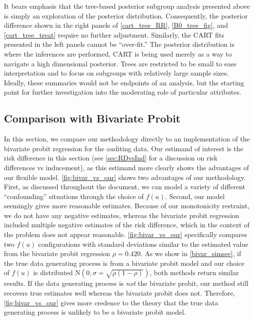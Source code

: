 \documentclass[aoas,preprint, 11pt, dvipsnames, table, x11name]{imsart}
\newcommand{\N}{\mbox{N}}
\theoremstyle{remark}
\begin{document}
	It bears emphasis that the tree-based posterior subgroup analysis presented above is simply an exploration of the posterior distribution. Consequently, the posterior difference shown in the right panels of \autoref{cart_tree_RR}, \autoref{B0_tree_fig}, and \autoref{cart_tree_treat} require no further adjustment. Similarly, the CART fits presented in the left panels cannot be ``over-fit.'' The posterior distribution is where the inferences are performed, CART is being used merely as a way to navigate a high dimensional posterior. Trees are restricted to be small to ease interpretation and to focus on subgroups with relatively large sample sizes. Ideally, these summaries would not be endpoints of an analysis, but the starting point for further investigation into the moderating role of particular attributes.
	


	\subsection{Comparison with Bivariate Probit}\label{section:bivar_prob_compare}
In this section, we compare our methodology directly to an implementation of the bivariate probit regression for the auditing data.  Our estimand of interest is the risk difference in this section (see \autoref{sec:RDvsInd} for a discussion on risk differences vs inducement), as this estimand more clearly shows the advantages of our flexible model.  \autoref{fig:bivar_vs_our} shows two advantages of our methodology.  First, as discussed throughout the document, we can model a variety of different ``confounding'' situations through the choice of $f(u)$.  Second, our model seemingly gives more reasonable estimates.  Because of our monotonicity restraint, we do not have any negative estimates, whereas the bivariate probit regression included multiple negative estimates of the risk difference, which in the context of the problem does not appear reasonable.  \autoref{fig:bivar_vs_our} specifically compares two $f(u)$ configurations with standard deviations similar to the estimated value from the bivariate probit regression $\rho=0.420$.  As we show in \autoref{bivar_simsec}, if the true data generating process is from a bivariate probit model and our choice of $f(u)$ is distributed $\N(0, \sigma=\sqrt{\rho(1-\rho)})$, both methods return similar results.  If the data generating process is \emph{not} the bivariate probit, our method still recovers true estimates well whereas the bivariate probit does not.  Therefore, \autoref{fig:bivar_vs_our} gives more credence to the theory that the true data generating process is unlikely to be  a bivariate probit model.  
	
\end{document}
